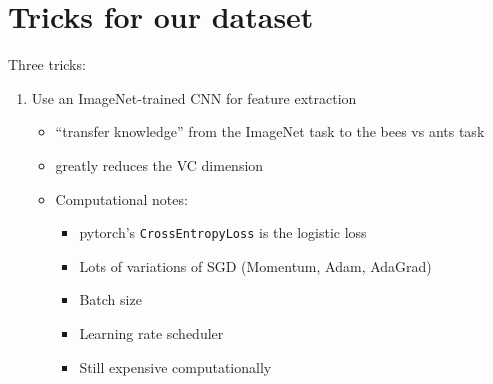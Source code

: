 \documentclass[10pt]{exam}
\theoremstyle{definition}
\newcommand{\Ein}{E_{\text{in}}}
\newcommand{\Eout}{E_{\text{out}}}
\begin{document}
\newpage
\section{Tricks for our dataset}

Three tricks:
\begin{enumerate}
    \item Use an ImageNet-trained CNN for feature extraction

        \begin{itemize}
            \item ``transfer knowledge'' from the ImageNet task to the bees vs ants task
                \vspace{1in}

            \item greatly reduces the VC dimension

                \vspace{3in}



            \item Computational notes:
                

                \begin{itemize}
                    \item pytorch's \lstinline{CrossEntropyLoss} is the logistic loss
                    \item Lots of variations of SGD (Momentum, Adam, AdaGrad)
                    \item Batch size
                    \item Learning rate scheduler
                    \item Still expensive computationally
                \end{itemize}
        \end{itemize}


\end{enumerate}
\end{document}
